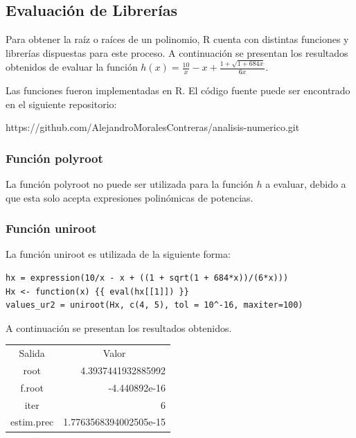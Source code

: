 \documentclass[a4paper,12pt]{article}
\begin{document}
\newpage

\subsection{Evaluación de Librerías}

Para obtener la raíz o raíces de un polinomio, R cuenta con distintas funciones y librerías dispuestas para este proceso. A continuación se presentan los resultados obtenidos de evaluar la función $h(x)=\frac{10}{x}-x +\frac{1 + \sqrt{1 + 684 x}}{6x}$. \par 

Las funciones fueron implementadas en R. El código fuente puede ser encontrado en el siguiente repositorio: \par

\vspace{1em}
https://github.com/AlejandroMoralesContreras/analisis-numerico.git \par

\subsubsection{Función polyroot}

La función polyroot no puede ser utilizada para la función $h$ a evaluar, debido a que esta solo acepta expresiones polinómicas de potencias. \par 

\subsubsection{Función uniroot}

La función uniroot es utilizada de la siguiente forma: \par

\begin{verbatim}
hx = expression(10/x - x + ((1 + sqrt(1 + 684*x))/(6*x)))
Hx <- function(x) {{ eval(hx[[1]]) }}
values_ur2 = uniroot(Hx, c(4, 5), tol = 10^-16, maxiter=100)
\end{verbatim}

A continuación se presentan los resultados obtenidos. \par

\begin{table}[ht!]
\begin{tabular}{cr}
Salida     & \multicolumn{1}{c}{Valor}                  \\
root       & 4.3937441932885992                         \\
f.root     & -4.440892e-16                              \\
iter       & 6                                          \\
estim.prec & \multicolumn{1}{l}{1.7763568394002505e-15}
\end{tabular}
\end{table}
\end{document}
